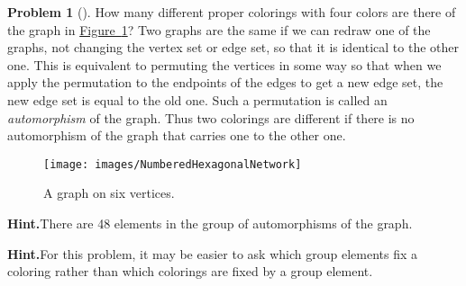 \documentclass[10pt,]{book}
\theoremstyle{plain}
\theoremstyle{definition}
\newtheorem{activity}[project]{Problem}
\theoremstyle{definition}
\numberwithin{equation}{chapter}
\begin{document}
\begin{activity}[]\label{activity-309}
How many different proper colorings with four colors are there of the graph in \hyperref[starhexagon]{Figure~\ref{starhexagon}}? Two graphs are the same if we can redraw one of the graphs, not changing the vertex set or edge set, so that it is identical to the other one. This is equivalent to permuting the vertices in some way so that when we apply the permutation to the endpoints of the edges to get a new edge set, the new edge set is equal to the old one. Such a permutation is called an \emph{automorphism} of the graph. Thus two colorings are different if there is no automorphism of the graph that carries one to the other one.%
\begin{figure}
\centering
\texttt{[image: images/NumberedHexagonalNetwork]}
\caption{A graph on six vertices.\label{starhexagon}}
\end{figure}
\par\medskip\noindent%
\textbf{Hint.}\quad There are 48 elements in the group of automorphisms of the graph.%
\par\medskip\noindent%
\textbf{Hint.}\quad For this problem, it may be easier to ask which group elements fix a coloring rather than which colorings are fixed by a group element.%
\par\medskip\noindent%

\end{activity}
\end{document}
